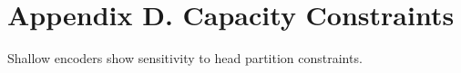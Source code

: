 \section*{Appendix D. Capacity Constraints}Shallow encoders show sensitivity to head partition constraints.
